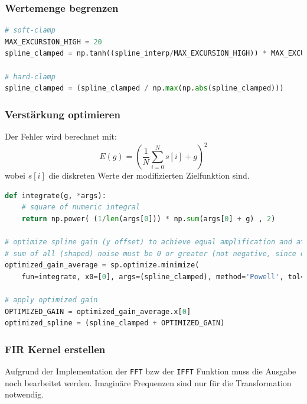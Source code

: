 \hypertarget{wertemenge-begrenzen}{%
\subsubsection{Wertemenge begrenzen}\label{wertemenge-begrenzen}}

\begin{lstlisting}[language=Python]
# soft-clamp
MAX_EXCURSION_HIGH = 20
spline_clamped = np.tanh((spline_interp/MAX_EXCURSION_HIGH)) * MAX_EXCURSION_HIGH

# hard-clamp
spline_clamped = (spline_clamped / np.max(np.abs(spline_clamped)))
\end{lstlisting}

\hypertarget{verstuxe4rkung-optimieren}{%
\subsubsection{Verstärkung optimieren}\label{verstuxe4rkung-optimieren}}

Der Fehler wird berechnet mit: \[
E(g) = \left( \frac{1}{N} \sum_{i=0}^{N} s[i] + g \right)^2
\] wobei \(s[i]\) die diskreten Werte der modifizierten Zielfunktion
sind.

\begin{lstlisting}[language=Python]
def integrate(g, *args):
    # square of numeric integral
    return np.power( (1/len(args[0])) * np.sum(args[0] + g) , 2)

# optimize spline gain (y offset) to achieve equal amplification and attenuation
# sum of all (shaped) noise must be 0 or greater (not negative, since energy musnt be lost)
optimized_gain_average = sp.optimize.minimize(
    fun=integrate, x0=[0], args=(spline_clamped), method='Powell', tol=1e-16, options={'disp': False})

# apply optimized gain
OPTIMIZED_GAIN = optimized_gain_average.x[0]
optimized_spline = (spline_clamped + OPTIMIZED_GAIN)
\end{lstlisting}

\hypertarget{fir-kernel-erstellen}{%
\subsubsection{FIR Kernel erstellen}\label{fir-kernel-erstellen}}

Aufgrund der Implementation der \texttt{FFT} bzw der \texttt{IFFT}
Funktion muss die Ausgabe noch bearbeitet werden. Imaginäre Frequenzen
sind nur für die Transformation notwendig.

